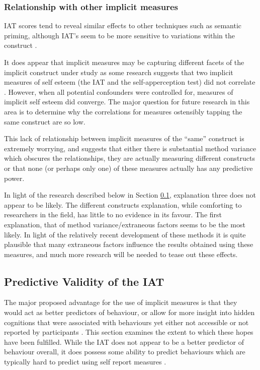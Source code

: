\subsubsection{Relationship with other implicit measures}
\label{sec:relat-with-other}


IAT scores tend to reveal similar effects to other techniques such as semantic priming, although IAT's seem to be more sensitive to variations within the construct \cite{Wittenbrink2007a}.

It does appear that implicit measures may be capturing different facets of the implicit construct under study as some research suggests that two implicit measures of self esteem (the IAT and the self-apperception test) did not correlate \cite{Meagher2004}. However, when all potential confounders were controlled for, measures of implicit self esteem did converge. The major question for future research in this area is to determine why the correlations for measures ostensibly tapping the same construct are so low.

This lack of relationship between implicit measures of the ``same'' construct is extremely worrying, and suggests that either there is substantial method variance which obscures the relationships, they are actually measuring different constructs or that none (or perhaps only one) of these measures actually has any predictive power. 

In light of the research described below in Section \ref{sec:pred-valid-iat}, explanation three does not appear to be likely. The different constructs explanation, while comforting to researchers in the field, has little to no evidence in its favour. The first explanation, that of method variance/extraneous factors seems to be the most likely. In light of the relatively recent development of these methods it is quite plausible that many extraneous factors influence the results obtained using these measures, and much more research will be needed to tease out these effects. 


\subsection{Predictive Validity of the IAT}
\label{sec:pred-valid-iat}


The major proposed advantage for the use of implicit measures is that they would act as better predictors of behaviour, or allow for more insight into hidden cognitions that were associated with behaviours yet either not accessible or not reported by participants \cite{Greenwald1998}. This section examines the extent to which these hopes have been fulfilled. While the IAT does not appear to be a better predictor of behaviour overall, it does possess some ability to predict behaviours which are typically hard to predict using self report measures \cite{Greenwald2009}. 

